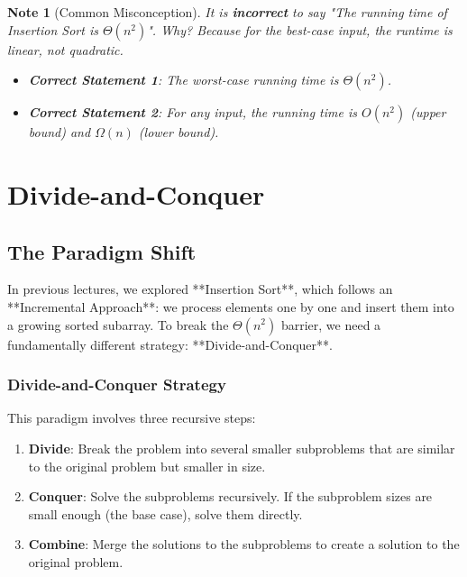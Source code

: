 \documentclass[12pt]{article}
\theoremstyle{blueplain}
\theoremstyle{bluedef}
\theoremstyle{blueremark}
\newtheorem{note}{Note}[section]
\begin{document}
\begin{note}[Common Misconception]
    It is \textbf{incorrect} to say "The running time of Insertion Sort is $\Theta(n^2)$".
    Why? Because for the best-case input, the runtime is linear, not quadratic.
    \begin{itemize}
        \item \textbf{Correct Statement 1}: The \textit{worst-case} running time is $\Theta(n^2)$.
        \item \textbf{Correct Statement 2}: For \textit{any} input, the running time is $O(n^2)$ (upper bound) and $\Omega(n)$ (lower bound).
    \end{itemize}
\end{note}

\clearpage


\section{Divide-and-Conquer}

\subsection{The Paradigm Shift}

In previous lectures, we explored **Insertion Sort**, which follows an **Incremental Approach**: we process elements one by one and insert them into a growing sorted subarray.
To break the $\Theta(n^2)$ barrier, we need a fundamentally different strategy: **Divide-and-Conquer**.

\subsubsection{Divide-and-Conquer Strategy}
This paradigm involves three recursive steps:
\begin{enumerate}
    \item \textbf{Divide}: Break the problem into several smaller subproblems that are similar to the original problem but smaller in size.
    \item \textbf{Conquer}: Solve the subproblems recursively. If the subproblem sizes are small enough (the base case), solve them directly.
    \item \textbf{Combine}: Merge the solutions to the subproblems to create a solution to the original problem.
\end{enumerate}
\end{document}
